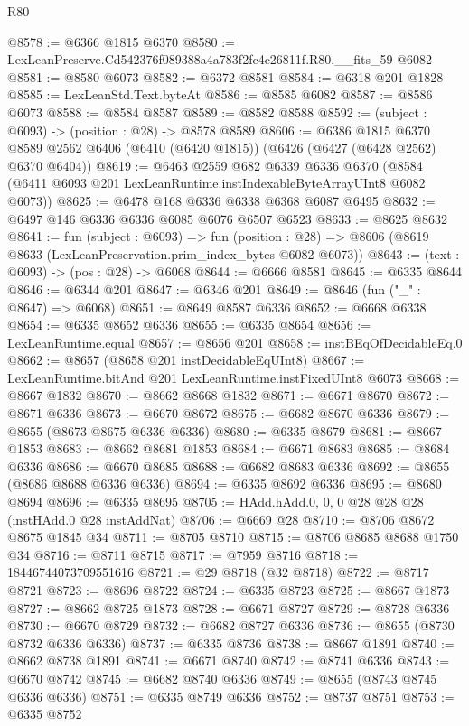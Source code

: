 \begin{lexlean}{R80}
\begin{coremodule}
@8578 := @6366 @1815 @6370
@8580 := LexLeanPreserve.Cd542376f089388a4a783f2fc4c26811f.R80.__fits_59 @6082
@8581 := @8580 @6073
@8582 := @6372 @8581
@8584 := @6318 @201 @1828
@8585 := LexLeanStd.Text.byteAt
@8586 := @8585 @6082
@8587 := @8586 @6073
@8588 := @8584 @8587
@8589 := @8582 @8588
@8592 := (subject : @6093) -> (position : @28) -> @8578 @8589
@8606 := @6386
    @1815
    @6370
    @8589
    @2562
    @6406
    (@6410 (@6420 @1815))
    (@6426 (@6427 (@6428 @2562) @6370 @6404))
@8619 := @6463
    @2559
    @682
    @6339
    @6336
    @6370
    (@8584 (@6411 @6093 @201 LexLeanRuntime.instIndexableByteArrayUInt8 @6082 @6073))
@8625 := @6478 @168 @6336 @6338 @6368 @6087 @6495
@8632 := @6497 @146 @6336 @6336 @6085 @6076 @6507 @6523
@8633 := @8625 @8632
@8641 := fun (subject : @6093) =>
  fun (position : @28) => @8606 (@8619 @8633 (LexLeanPreservation.prim_index_bytes @6082 @6073))
@8643 := (text : @6093) -> (pos : @28) -> @6068
@8644 := @6666 @8581
@8645 := @6335 @8644
@8646 := @6344 @201
@8647 := @6346 @201
@8649 := @8646 (fun ("_" : @8647) => @6068)
@8651 := @8649 @8587 @6336
@8652 := @6668 @6338
@8654 := @6335 @8652 @6336
@8655 := @6335 @8654
@8656 := LexLeanRuntime.equal
@8657 := @8656 @201
@8658 := instBEqOfDecidableEq.{0}
@8662 := @8657 (@8658 @201 instDecidableEqUInt8)
@8667 := LexLeanRuntime.bitAnd @201 LexLeanRuntime.instFixedUInt8 @6073
@8668 := @8667 @1832
@8670 := @8662 @8668 @1832
@8671 := @6671 @8670
@8672 := @8671 @6336
@8673 := @6670 @8672
@8675 := @6682 @8670 @6336
@8679 := @8655 (@8673 @8675 @6336 @6336)
@8680 := @6335 @8679
@8681 := @8667 @1853
@8683 := @8662 @8681 @1853
@8684 := @6671 @8683
@8685 := @8684 @6336
@8686 := @6670 @8685
@8688 := @6682 @8683 @6336
@8692 := @8655 (@8686 @8688 @6336 @6336)
@8694 := @6335 @8692 @6336
@8695 := @8680 @8694
@8696 := @6335 @8695
@8705 := HAdd.hAdd.{0, 0, 0} @28 @28 @28 (instHAdd.{0} @28 instAddNat)
@8706 := @6669 @28
@8710 := @8706 @8672 @8675 @1845 @34
@8711 := @8705 @8710
@8715 := @8706 @8685 @8688 @1750 @34
@8716 := @8711 @8715
@8717 := @7959 @8716
@8718 := 18446744073709551616
@8721 := @29 @8718 (@32 @8718)
@8722 := @8717 @8721
@8723 := @8696 @8722
@8724 := @6335 @8723
@8725 := @8667 @1873
@8727 := @8662 @8725 @1873
@8728 := @6671 @8727
@8729 := @8728 @6336
@8730 := @6670 @8729
@8732 := @6682 @8727 @6336
@8736 := @8655 (@8730 @8732 @6336 @6336)
@8737 := @6335 @8736
@8738 := @8667 @1891
@8740 := @8662 @8738 @1891
@8741 := @6671 @8740
@8742 := @8741 @6336
@8743 := @6670 @8742
@8745 := @6682 @8740 @6336
@8749 := @8655 (@8743 @8745 @6336 @6336)
@8751 := @6335 @8749 @6336
@8752 := @8737 @8751
@8753 := @6335 @8752

\end{coremodule}
\end{lexlean}
